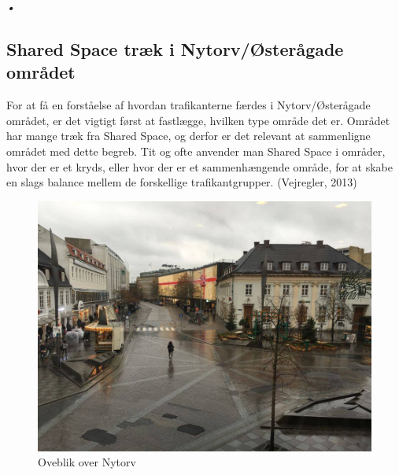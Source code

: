 \emph{•}\subsection{Shared Space træk i Nytorv/Østerågade området}
\label{omrade_sharedspace}
For at få en forståelse af hvordan trafikanterne færdes i Nytorv/Østerågade området, er det vigtigt først at fastlægge, hvilken type område det er. Området har mange træk fra Shared Space, og derfor er det relevant at sammenligne området med dette begreb.
Tit og ofte anvender man Shared Space i områder, hvor der er et kryds, eller hvor der er et sammenhængende område, for at skabe en slags balance mellem de forskellige trafikantgrupper. (Vejregler, 2013)

\begin{figure}[htbp]
   \centering
   \begin{adjustbox}{max width=\textwidth}
     \includegraphics[scale=0.3]{figures/Billederogfigur/Nytorvoverblik.jpg}
  \end{adjustbox}
   \caption{Oveblik over Nytorv}
   \label{fig:nytorv}
 \end{figure}

